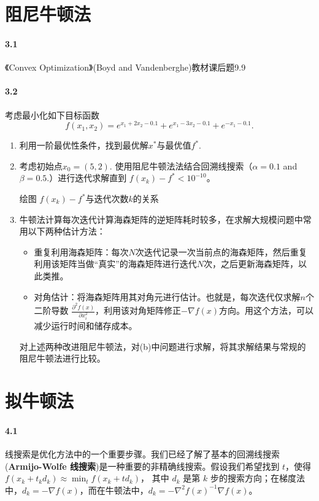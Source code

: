 \documentclass[12pt,a4paper]{article}
\begin{document}
\section{阻尼牛顿法}
\paragraph{3.1}《Convex Optimization》(Boyd and Vandenberghe)教材课后题9.9

\paragraph{3.2}
考虑最小化如下目标函数
$$f(x_1,x_2)=e^{x_1+2x_2-0.1}+e^{x_1-3x_2-0.1}+e^{-x_1-0.1}.$$

\begin{enumerate}
	\item[(a)] 利用一阶最优性条件，找到最优解$x^*$与最优值$f^*$.
	
	\item[(b)] 考虑初始点$x_0=(5,2)$. 使用阻尼牛顿法法结合回溯线搜索（$\alpha=0.1$ and $\beta=0.5$.）进行迭代求解直到 $f(x_k)-f^*<10^{-10}$。

    绘图 $f(x_k)- f^*$与迭代次数$k$的关系
	
	\item[(c)] 牛顿法计算每次迭代计算海森矩阵的逆矩阵耗时较多，在求解大规模问题中常用以下两种估计方法：
	
	\begin{itemize}
		\item 重复利用海森矩阵：每次$N$次迭代记录一次当前点的海森矩阵，然后重复利用该矩阵当做“真实”的海森矩阵进行迭代$N$次，之后更新海森矩阵，以此类推。		
		\item 对角估计：将海森矩阵用其对角元进行估计。也就是，每次迭代仅求解$n$个二阶导数
        $\frac{\partial^2 f(x)}{\partial x_i^2}$，利用该对角矩阵修正$-\nabla f(x)$方向。用这个方法，可以减少运行时间和储存成本。	
	\end{itemize}
对上述两种改进阻尼牛顿法，对(b)中问题进行求解，将其求解结果与常规的阻尼牛顿法进行比较。
\end{enumerate}




\section{拟牛顿法}

\paragraph{4.1}
线搜索是优化方法中的一个重要步骤。我们已经了解了基本的回溯线搜索(\textbf{Armijo-Wolfe 线搜索})是一种重要的非精确线搜索。假设我们希望找到 $t$，使得
$f(x_k+t_kd_k) \approx \min_{t} f(x_k+td_k)$，
其中 $d_k$ 是第 $k$ 步的搜索方向；在梯度法中，$d_k=-\nabla f(x)$，而在牛顿法中，$d_k=-\nabla^2 f(x)^{-1} \nabla f(x)$。
\end{document}
